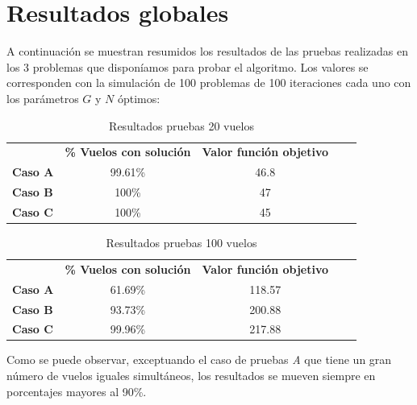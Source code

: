 \section{Resultados globales}
A continuación se muestran resumidos los resultados de las pruebas realizadas en los 3 problemas que disponíamos para probar el algoritmo. Los valores se corresponden con la simulación de 100 problemas de 100 iteraciones cada uno con los parámetros $G$ y $N$ óptimos:
\begin{table}[H]
	\centering
	\caption{Resultados pruebas 20 vuelos}
	\label{resultados 20 vuelos}
	\begin{tabular}{lllll}
		& \textbf{\% Vuelos con solución} & \textbf{Valor función objetivo} & \textbf{} & \textbf{} \\
		\textbf{Caso A} & \multicolumn{1}{c}{99.61\%} &\multicolumn{1}{c}{46.8} & &\\
		\textbf{Caso B} & \multicolumn{1}{c}{100\% }    &\multicolumn{1}{c}{47} & &\\
		\textbf{Caso C} & \multicolumn{1}{c}{100\%}    &\multicolumn{1}{c}{45} & &
	\end{tabular}
\end{table}


\begin{table}[H]
	\centering
	\caption{Resultados pruebas 100 vuelos}
	\label{resultados 100 vuelos}
	\begin{tabular}{lllll}
		& \textbf{\% Vuelos con solución} & \textbf{Valor función objetivo} & \textbf{} & \textbf{} \\
		\textbf{Caso A} & \multicolumn{1}{c}{61.69\%} &\multicolumn{1}{c}{118.57} & &\\
		\textbf{Caso B} & \multicolumn{1}{c}{93.73\%}    &\multicolumn{1}{c}{200.88} & & \\
		\textbf{Caso C} & \multicolumn{1}{c}{99.96\%}    &\multicolumn{1}{c}{217.88} & &
	\end{tabular}
\end{table}

Como se puede observar, exceptuando el caso de pruebas \textit{A} que tiene un gran número de vuelos iguales simultáneos, los resultados se mueven siempre en porcentajes mayores al 90\%.

